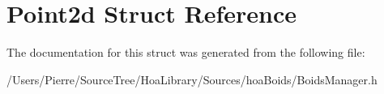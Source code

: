 \hypertarget{struct_point2d}{\section{Point2d Struct Reference}
\label{struct_point2d}
}


The documentation for this struct was generated from the following file\-:\begin{DoxyCompactItemize}
\item 
/\-Users/\-Pierre/\-Source\-Tree/\-Hoa\-Library/\-Sources/hoa\-Boids/Boids\-Manager.\-h\end{DoxyCompactItemize}
